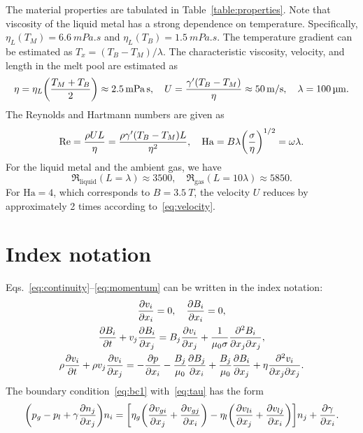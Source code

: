 \documentclass{article}
\newcommand{\Ha}{\mathrm{Ha}}
\begin{document}
The material properties are tabulated in Table~\ref{table:properties}.
Note that viscosity of the liquid metal has a strong dependence on temperature.
Specifically, $\eta_L(T_M) = \SI{6.6}{mPa.s}$ and $\eta_L(T_B) = \SI{1.5}{mPa.s}$.
The temperature gradient can be estimated as $T_x=(T_B-T_M)/\lambda$.
The characteristic viscosity, velocity, and length in the melt pool are estimated as
\begin{equation}
    \eta = \eta_L\qty(\frac{T_M+T_B}{2}) \approx \SI{2.5}{mPa.s}, \quad
    U = \frac{\gamma'(T_B - T_M)}{\eta} \approx \SI{50}{m/s}, \quad
    \lambda = \SI{100}{\um}.
\end{equation}
The Reynolds and Hartmann numbers are given as
\begin{equation}
    \Re = \frac{\rho U L}{\eta} = \frac{\rho \gamma'(T_B - T_M) L}{\eta^2}, \quad
    \Ha = B\lambda\qty(\frac{\sigma}{\eta})^{1/2} = \omega\lambda.
\end{equation}
For the liquid metal and the ambient gas, we have
\begin{equation}
    \Re_\text{liquid}(L=\lambda) \approx 3500, \quad
    \Re_\text{gas}(L=10\lambda) \approx 5850.
\end{equation}
For $\Ha = 4$, which corresponds to $B = \SI{3.5}{T}$,
the velocity $U$ reduces by approximately 2 times according to~\eqref{eq:velocity}.

\appendix

\section{Index notation}

Eqs.~\eqref{eq:continuity}--\eqref{eq:momentum} can be written in the index notation:
\begin{gather}
    \pdv{v_i}{x_i} = 0, \quad \pdv{B_i}{x_i} = 0, \label{eq:continuityI}\\
    \pdv{B_i}{t} + v_j\pdv{B_i}{x_j} = B_j\pdv{v_i}{x_j} + \frac1{\mu_0\sigma} \pdv[2]{B_i}{x_j}{x_j}, \label{eq:BI}\\
    \rho\pdv{v_i}{t} + \rho v_j\pdv{v_i}{x_j}
    = -\pdv{p}{x_i} - \frac{B_j}{\mu_0}\pdv{B_j}{x_i} + \frac{B_j}{\mu_0}\pdv{B_i}{x_j} + \eta\pdv[2]{v_i}{x_j}{x_j}. \label{eq:momentumI}
\end{gather}
The boundary condition~\eqref{eq:bc1} with~\eqref{eq:tau} has the form
\begin{equation}\label{eq:bc1I}
    \qty(p_g - p_l + \gamma\pdv{n_j}{x_j})n_i
    = \qty[
        \eta_g\qty( \pdv{v_{gi}}{x_j} + \pdv{v_{gj}}{x_i} )
      - \eta_l\qty( \pdv{v_{li}}{x_j} + \pdv{v_{lj}}{x_i} )
    ]n_j + \pdv{\gamma}{x_i}.
\end{equation}

\printbibliography
\end{document}
